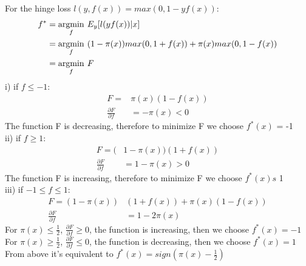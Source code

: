 \documentclass{article}
\newenvironment{problem}[2][$\bullet$]{\begin{trivlist}\large
		\item[\hskip \labelsep {\bfseries #1}\hskip \labelsep {\bfseries #2.}]}  {\end{trivlist}}
\begin{document}
\begin{problem}{5.4}
\end{problem}
For the hinge loss $l(y,f(x)) = max(0,1-yf(x))$:
\begin{align}
f^* &= \underset{f}{\operatorname{arg min}} \hspace{0.05in} E_y[l(yf(x))|x]\\
&= \underset{f}{\operatorname{arg min}} \hspace{0.05in} (1- \pi(x))max(0,1+f(x)) + \pi(x)max(0,1-f(x))\\
& = \underset{f}{\operatorname{arg min}} \hspace{0.05in} F
\end{align} 
i) if $f \leq -1$:
\begin{align}
F = &\pi(x) (1-f(x)) \\
\frac{\partial F}{\partial f}&= -\pi(x) <0
\end{align} 
The function F is decreasing, therefore to minimize F we choose $f^*(x)$ = -1\\
ii) if $f \geq 1$:
\begin{align}
F = (& 1-\pi(x)) (1+f(x)) \\
\frac{\partial F}{\partial f}&= 1-\pi(x) >0
\end{align} 
The function F is increasing, therefore to minimize F we choose $f^*(x)s$ 1\\
iii) if $-1 \leq f \leq 1$:
\begin{align}
F = (1-\pi(x)) &(1+f(x)) +   \pi(x) (1-f(x))  \\
\frac{\partial F}{\partial f}&= 1-2\pi(x)
\end{align}
For $\pi(x)\leq \frac{1}{2}$, $\frac{\partial F}{\partial f} \geq 0 $, the function is increasing, then we choose $f^*(x) = -1$ \\
For $\pi(x)\geq \frac{1}{2}$, $\frac{\partial F}{\partial f} \leq 0 $, the function is decreasing, then we choose $f^*(x) = 1$ \\
From above it's equivalent to $f^*(x) = sign(\pi(x)-\frac{1}{2})$
\end{document}
